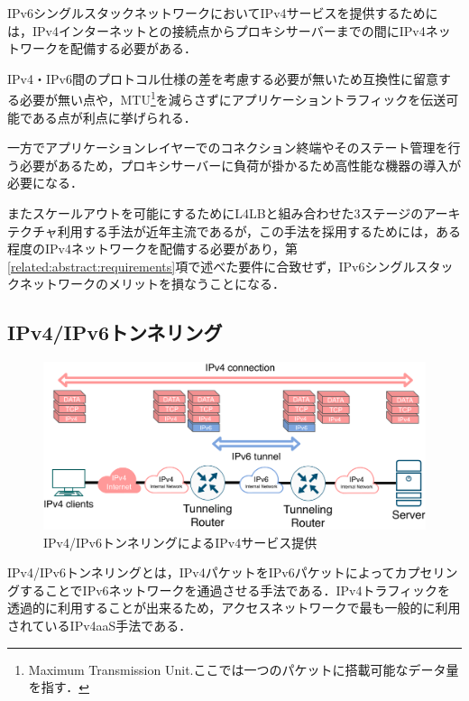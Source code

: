IPv6シングルスタックネットワークにおいてIPv4サービスを提供するためには，IPv4インターネットとの接続点からプロキシサーバーまでの間にIPv4ネットワークを配備する必要がある．

IPv4・IPv6間のプロトコル仕様の差を考慮する必要が無いため互換性に留意する必要が無い点や，MTU\footnote{Maximum Transmission Unit.ここでは一つのパケットに搭載可能なデータ量を指す．}を減らさずにアプリケーショントラフィックを伝送可能である点が利点に挙げられる．

一方でアプリケーションレイヤーでのコネクション終端やそのステート管理を行う必要があるため，プロキシサーバーに負荷が掛かるため高性能な機器の導入が必要になる．

またスケールアウトを可能にするためにL4LBと組み合わせた3ステージのアーキテクチャ利用する手法が近年主流である\cite{Facebook_LB, Google_LB}が，この手法を採用するためには，ある程度のIPv4ネットワークを配備する必要があり，第\ref{related:abstract:requirements}項で述べた要件に合致せず，IPv6シングルスタックネットワークのメリットを損なうことになる．



\subsection{IPv4/IPv6トンネリング}
\begin{figure}[h]
    \begin{center}
      \includegraphics[width=15cm,pagebox=cropbox,clip]{img/Tunneling_model.pdf}
    \end{center}
    \caption{IPv4/IPv6トンネリングによるIPv4サービス提供}
    \label{fig:tunneling_model}
\end{figure}

IPv4/IPv6トンネリングとは，IPv4パケットをIPv6パケットによってカプセリングすることでIPv6ネットワークを通過させる手法である．IPv4トラフィックを透過的に利用することが出来るため，アクセスネットワークで最も一般的に利用されているIPv4aaS手法である\cite{RFC8585}．

